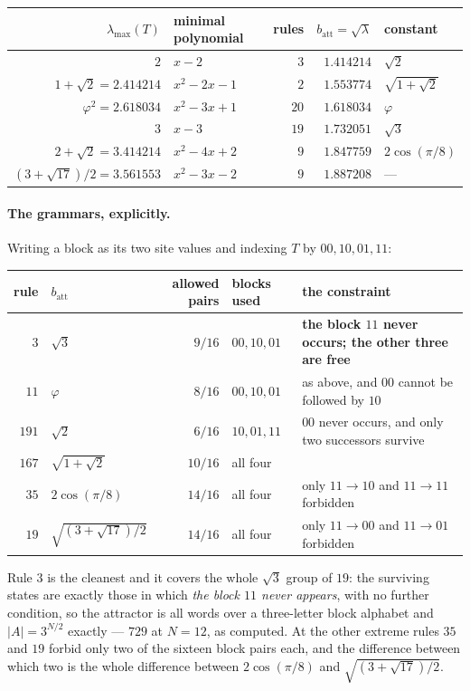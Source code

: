 \documentclass[11pt]{article}
\newcommand{\att}{\mathrm{att}}
\begin{document}
\begin{center}\small
\begin{tabular}{rlrrl}
\toprule
$\lambda_{\max}(T)$ & minimal polynomial & rules & $b_\att=\sqrt{\lambda}$ & constant \\
\midrule
$2$ & $x-2$ & $3$ & $1.414214$ & $\sqrt2$ \\
$1+\sqrt2 = 2.414214$ & $x^2-2x-1$ & $2$ & $1.553774$ & $\sqrt{1+\sqrt2}$ \\
$\varphi^2 = 2.618034$ & $x^2-3x+1$ & $20$ & $1.618034$ & $\varphi$ \\
$3$ & $x-3$ & $19$ & $1.732051$ & $\sqrt3$ \\
$2+\sqrt2 = 3.414214$ & $x^2-4x+2$ & $9$ & $1.847759$ & $2\cos(\pi/8)$ \\
$(3+\sqrt{17})/2 = 3.561553$ & $x^2-3x-2$ & $9$ & $1.887208$ & --- \\
\bottomrule
\end{tabular}
\end{center}

\paragraph{The grammars, explicitly.} Writing a block as its two site values
and indexing $T$ by $00,10,01,11$:

\begin{center}\small
\begin{tabular}{rlrll}
\toprule
rule & $b_\att$ & allowed pairs & blocks used & the constraint \\
\midrule
$3$   & $\sqrt3$ & $9/16$ & $00,10,01$ & \textbf{the block $11$ never occurs; the other three are free} \\
$11$  & $\varphi$ & $8/16$ & $00,10,01$ & as above, and $00$ cannot be followed by $10$ \\
$191$ & $\sqrt2$ & $6/16$ & $10,01,11$ & $00$ never occurs, and only two successors survive \\
$167$ & $\sqrt{1+\sqrt2}$ & $10/16$ & all four & \\
$35$  & $2\cos(\pi/8)$ & $14/16$ & all four & only $11\to10$ and $11\to11$ forbidden \\
$19$  & $\sqrt{(3+\sqrt{17})/2}$ & $14/16$ & all four & only $11\to00$ and $11\to01$ forbidden \\
\bottomrule
\end{tabular}
\end{center}

\noindent Rule $3$ is the cleanest and it covers the whole $\sqrt3$ group of
$19$: the surviving states are exactly those in which \emph{the block $11$ never
appears}, with no further condition, so the attractor is all words over a
three-letter block alphabet and $|A|=3^{N/2}$ exactly --- $729$ at $N=12$, as
computed. At the other extreme rules $35$ and $19$ forbid only two of the
sixteen block pairs each, and the difference between which two is the whole
difference between $2\cos(\pi/8)$ and $\sqrt{(3+\sqrt{17})/2}$.
\end{document}
